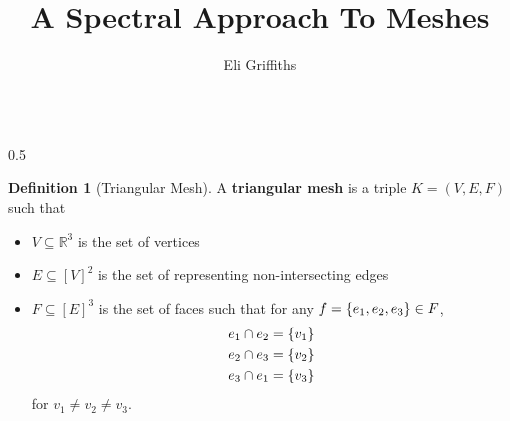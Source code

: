 \documentclass[notheorems]{beamer}
\author{Eli Griffiths}
\title{A Spectral Approach To Meshes}
\theoremstyle{definition}
\newtheorem{definition}{Definition}
\begin{document}
\begin{frame}
    \titlepage
\end{frame}

\begin{frame}
    \begin{columns}
    \begin{column}{0.5\pagewidth}
        \begin{definition}[Triangular Mesh]
            A \textbf{triangular mesh} is a triple $K = (V, E, F)$ such that
            \begin{itemize}
                \item<2-> $V \subseteq \mathbb{R}^3$ is the set of vertices
                \item<3-> $E \subseteq [V]^2$ is the set of representing non-intersecting edges
                \item<4-> $F \subseteq [E]^3$ is the set of faces such that for any $f = \qty{e_1, e_2, e_3} \in F$, 
                    \begin{align*}
                        e_1 \cap e_2 &= \qty{v_1} \\
                        e_2 \cap e_3 &= \qty{v_2} \\
                        e_3 \cap e_1 &= \qty{v_3}
                    \end{align*}
                    for $v_1 \neq v_2 \neq v_3$. 
            \end{itemize}
        \end{definition}
    \end{column}


\end{columns}
\end{frame}
\end{document}
